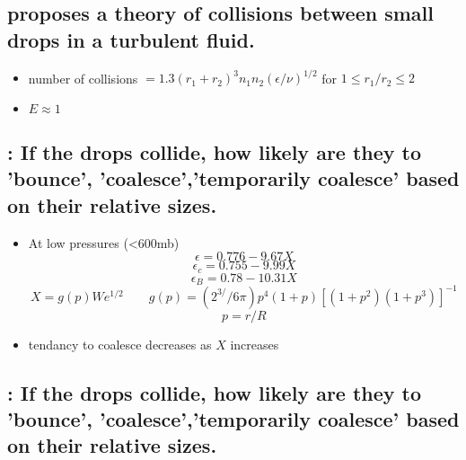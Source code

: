 \documentclass[10pt,a4paper]{article}
\begin{document}
\subsection*{\citet{Saffman1956} proposes a theory of collisions between small drops in a turbulent fluid.}

\begin{itemize}
\item
number of collisions $=1.3(r_1+r_2)^3n_1n_2(\epsilon/\nu)^{1/2}$ for $1\leq r_1/r_2 \leq 2$
\item 
$E \approx 1$
\end{itemize}

\subsection*{\citet{Beard1995}: If the drops collide, how likely are they to 'bounce', 'coalesce','temporarily coalesce' based on their relative sizes.}

\begin{itemize}
\item At low pressures (<600mb)
\[ \epsilon = 0.776 - 9.67X \]
\[ \epsilon_c = 0.755 - 9.99X \]
\[ \epsilon_B = 0.78 - 10.31X \]
\[ X= g(p)We^{1/2} \qquad g(p) = (2^{3/}/6\pi)p^4(1+p)[(1+p^2)(1+p^3)]^{-1}\]
\[p=r/R\]
\item
tendancy to coalesce decreases as $X$ increases
\end{itemize}
\subsection*{\citet{Beard2001}: If the drops collide, how likely are they to 'bounce', 'coalesce','temporarily coalesce' based on their relative sizes.}
\end{document}
